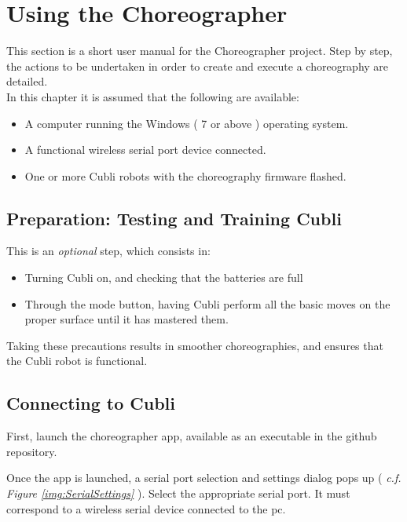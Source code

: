 \chapter{Using the Choreographer}\label{sec:usingthe}

This section is a short user manual for the Choreographer project.
Step by step, the actions to be undertaken in order to create and execute a choreography are detailed.\\

In this chapter it is assumed that the following are available:
\begin{itemize}
\item A computer running the Windows ( 7 or above ) operating system.
\item A functional wireless serial port device connected.
\item One or more Cubli robots with the choreography firmware flashed.
\end{itemize}

\section{Preparation: Testing and Training Cubli}

This is an \textit{optional} step, which consists in:

\begin{itemize}
\item[] Turning Cubli on, and checking that the batteries are full
\item[] Through the mode button, having Cubli perform all the basic moves on the proper surface until it has mastered them.
\end{itemize}

Taking these precautions results in smoother choreographies, and ensures that the Cubli robot is functional.

\section{Connecting to Cubli}

First, launch the choreographer app, available as an executable in the github repository.

Once the app is launched, a serial port selection and settings dialog pops up ( \textit{c.f. Figure \ref{img:SerialSettings}} ). Select the appropriate serial port. It must correspond to a wireless serial device connected to the pc.

